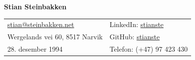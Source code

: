 \documentclass[letterpaper,10pt,oneside]{article}
\begin{document}

\noindent  \LARGE{\textbf{Stian Steinbakken}}
 \\
\vspace{-2ex}
\noindent\hrulefill 
\normalsize


\begin{center}
\begin{tabular}{l l}
\href{mailto:stiansteinbakken94@gmail.com}{stian@steinbakken.net}
 & \hspace{1in} LinkedIn: \href{https://www.linkedin.com/in/stianste/}{stianste}\\
 Wergelands vei 60, 8517 Narvik & \hspace{1in} GitHub: \href{https://github.com/stianste}{stianste}\\
 28. desember 1994 & \hspace{1in} Telefon: (+47) 97 423 430\\
\end{tabular}
\end{center}

\vspace{1em}

\end{document}

